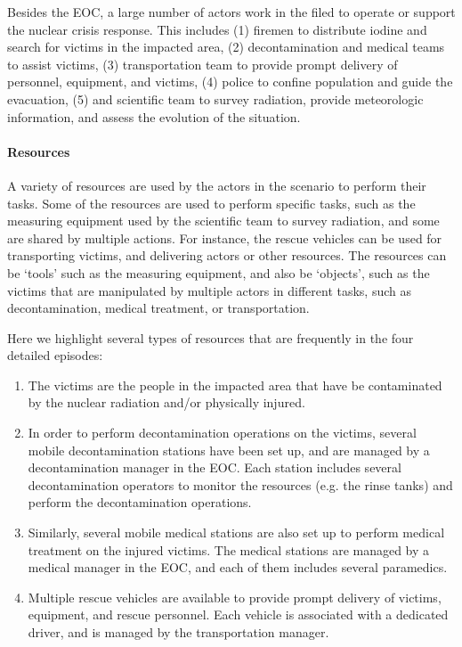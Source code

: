 Besides the EOC, a large number of actors work in the filed to operate or support the nuclear crisis response. This includes (1) firemen to distribute iodine and search for victims in the impacted area, (2) decontamination and medical teams to assist victims, (3) transportation team to provide prompt delivery of personnel, equipment, and victims, (4) police to confine population and guide the evacuation, (5) and scientific team to survey radiation, provide meteorologic information, and assess the evolution of the situation.

\paragraph*{Resources} %
\label{par:resources}
A variety of resources are used by the actors in the scenario to perform their tasks. Some of the resources are used to perform specific tasks, such as the measuring equipment used by the scientific team to survey radiation, and some are shared by multiple actions. For instance, the rescue vehicles can be used for transporting victims, and delivering actors or other resources. The resources can be `tools' such as the measuring equipment, and also be `objects', such as the victims that are manipulated by multiple actors in different tasks, such as decontamination, medical treatment, or transportation. 

Here we highlight several types of resources that are frequently in the four detailed episodes:

\begin{enumerate}
	\item The victims are the people in the impacted area that have be contaminated by the nuclear radiation and/or physically injured.
	\item In order to perform decontamination operations on the victims, several mobile decontamination stations have been set up, and are managed by a decontamination manager in the EOC. Each station includes several decontamination operators to monitor the resources (e.g. the rinse tanks) and perform the decontamination operations.
	\item Similarly, several mobile medical stations are also set up to perform medical treatment on the injured victims. The medical stations are managed by a medical manager in the EOC, and each of them includes several paramedics.
	\item Multiple rescue vehicles are available to provide prompt delivery of victims, equipment, and rescue personnel. Each vehicle is associated with a dedicated driver, and is managed by the transportation manager.
\end{enumerate}

